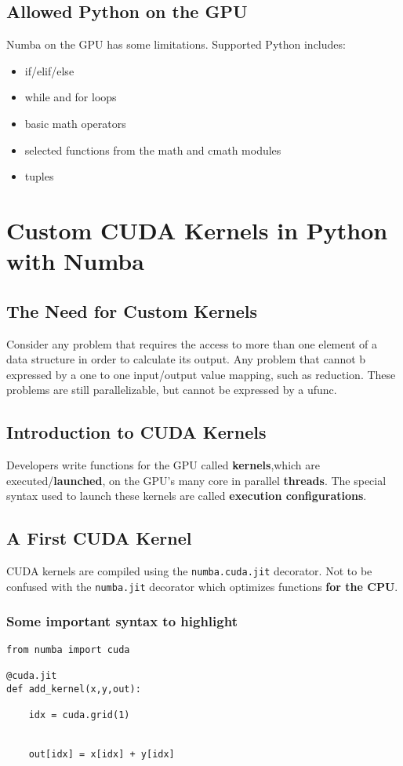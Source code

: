 \documentclass{article}
\begin{document}
\subsection{Allowed Python on the GPU}
Numba on the GPU has some limitations. Supported Python includes:

\begin{itemize}
	\item if/elif/else
	\item while and for loops
	\item basic math operators
	\item selected functions from the math and cmath modules
	\item tuples
\end{itemize}

\section{Custom CUDA Kernels in Python with Numba}
\subsection{The Need for Custom Kernels}
Consider any problem that requires the access to more than one element of a data structure in order to calculate its output. Any problem that cannot b expressed by a one to one input/output value mapping, such as reduction. These problems are still parallelizable, but cannot be expressed by a ufunc.

\subsection{Introduction to CUDA Kernels}
Developers write functions for the GPU called \textbf{kernels},which are executed/\textbf{launched}, on the GPU's many core in parallel \textbf{threads}. The special syntax used to launch these kernels are called \textbf{execution configurations}.

\subsection{A First CUDA Kernel}
CUDA kernels are compiled using the \verb_numba.cuda.jit_ decorator. Not to be confused with the \verb_numba.jit_ decorator which optimizes functions \textbf{for the CPU}.

\subsubsection{Some important syntax to highlight}
\begin{verbatim}
from numba import cuda

@cuda.jit 
def add_kernel(x,y,out):

	idx = cuda.grid(1)


	out[idx] = x[idx] + y[idx]
\end{verbatim}
\end{document}
